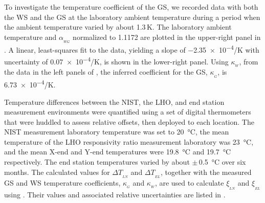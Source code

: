 \documentclass[12pt,a4paper,final]{iopart}
\begin{document}
To investigate the temperature coefficient of the GS, we recorded data with both the WS and the GS at the laboratory ambient temperature during a period when the ambient temperature varied by about 1.3\,K.  The laboratory ambient temperature and $\alpha_{_{WG}}$ normalized to 1.1172  are plotted in the upper-right panel in .  A  linear, least-squares fit to the data, yielding a slope of \num{-2.35e-4}/K with uncertainty of \num{0.07e-4}/K,  is shown in the lower-right panel.  Using $\kappa_{_{W}}$, from the data in the left panels of ,  the inferred coefficient for the GS, $\kappa_{_{G}}$, is \num{6.73e-4}/K. 

Temperature differences between the NIST, the LHO, and end station measurement environments were quantified using a set of digital thermometers that were huddled to assess relative offsets, then deployed to each location.  The NIST measurement laboratory temperature was set to \SI{20}{\celsius}, the mean temperature of the LHO responsivity ratio measurement laboratory was \SI{23}{\celsius}, and the mean X-end and Y-end temperatures were \SI{19.8}{\celsius} and \SI{19.7}{\celsius} respectively. The end station temperatures varied by about $\pm$\,\SI{0.5}{\celsius} over six months. The calculated values for $\Delta T_{_{LN}}$ and $\Delta T_{_{EL}}$, together with the measured GS and WS temperature coefficients, $\kappa_{_G}$ and $\kappa_{_W}$, are used to calculate $\xi_{_{LN}}$ and $\xi_{_{EL}}$ using .  Their values and associated relative uncertainties are listed in .
%
\end{document}
